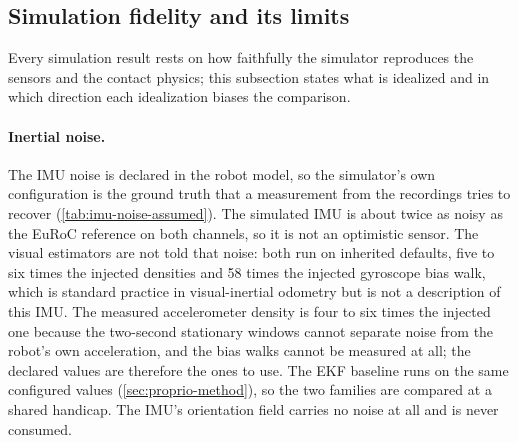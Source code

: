 \subsection{Simulation fidelity and its limits}
\label{sec:sim-fidelity}

Every simulation result rests on how faithfully the simulator reproduces the
sensors and the contact physics; this subsection states what is idealized and
in which direction each idealization biases the comparison.

\paragraph{Inertial noise.} The IMU noise is declared in the robot model, so
the simulator's own configuration is the ground truth that a measurement from
the recordings tries to recover (\cref{tab:imu-noise-assumed}). The simulated
IMU is about twice as noisy as the EuRoC reference on both channels, so it is
not an optimistic sensor. The visual estimators are not told that noise: both
run on inherited defaults, five to six times the injected densities and 58
times the injected gyroscope bias walk, which is standard practice in
visual-inertial odometry but is not a description of this IMU. The measured
accelerometer density is four to six times the injected one because the
two-second stationary windows cannot separate noise from the robot's own
acceleration, and the bias walks cannot be measured at all; the declared values
are therefore the ones to use. The EKF baseline runs on the same configured
values (\cref{sec:proprio-method}), so the two families are compared at a
shared handicap. The IMU's orientation field carries no noise at
all and is never consumed.

